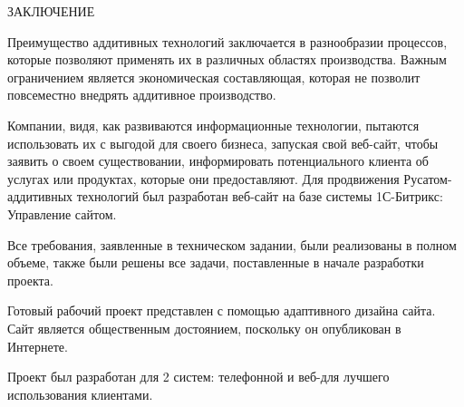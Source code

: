 \newpage
\begin{center}ЗАКЛЮЧЕНИЕ\end{center}


  Преимущество аддитивных технологий заключается в разнообразии процессов, которые позволяют применять их в различных областях производства. Важным ограничением является экономическая составляющая, которая не позволит повсеместно внедрять аддитивное производство. 
  
  Компании, видя, как развиваются информационные технологии, пытаются использовать их с выгодой для своего бизнеса, запуская свой веб-сайт, чтобы заявить о своем существовании, информировать потенциального клиента об услугах или продуктах, которые они предоставляют.
  Для продвижения Русатом-аддитивных технологий был разработан веб-сайт на базе системы 1С-Битрикс: Управление сайтом.
  
  Все требования, заявленные в техническом задании, были реализованы в полном объеме, также были решены все задачи, поставленные в начале разработки проекта.
  
  Готовый рабочий проект представлен с помощью адаптивного дизайна сайта. Сайт является общественным достоянием, поскольку он опубликован в Интернете.
  
  Проект был разработан для 2 систем: телефонной и веб-для лучшего использования клиентами.
